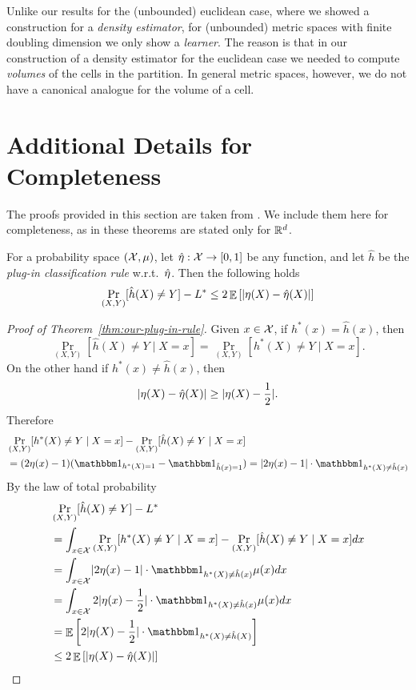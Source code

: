\documentclass[12pt,a4paper,oneside,onecolumn]{book}
\begin{document}
\begin{remark}
Unlike our results for the (unbounded) euclidean case, where we showed a construction for a {\em density estimator}, for (unbounded) metric spaces with finite doubling dimension we only show a {\em learner}. The reason is that in our construction of a density estimator for the euclidean case we needed to compute {\em volumes} of the cells in the partition. In general metric spaces, however, we do not have a canonical analogue for the volume of a cell.
\end{remark}


\section{Additional Details for Completeness}\label{sec:additional}

The proofs provided in this section are taken from \cite{devroye2013probabilistic}. We include them here for completeness, as in \cite{devroye2013probabilistic} these theorems are stated only for $\mathbb{R}^d$.

\begin{theorem}
\label{thm:our-plug-in-rule}
For a probability space $(\mathcal{X}, \mu)$, 
let $\hat{\eta}:\mathcal{X}\rightarrow[0,1]$ be any function,
and let $\hat{h}$ be the \emph{plug-in classification rule} w.r.t.\ $\hat{\eta}$. 
Then the following holds
\[
\Pr_{(X,Y)}[\hat{h}(X)\neq Y] - L^* \leq 
2 \mathop{\mathbb{E}}\left[\lvert\eta(X)-\hat{\eta}(X)\rvert\right]
\]
\end{theorem}

\begin{proof}[Proof of Theorem~\ref{thm:our-plug-in-rule}]
Given $x\in\mathcal{X}$,
if $h^*(x)=\hat{h}(x)$,
then
\[
\Pr_{(X,Y)}[\hat{h}(X)\neq Y \mid X=x]
=
\Pr_{(X,Y)}[h^*(X)\neq Y \mid X=x].
\]
On the other hand if
$h^*(x)\neq\hat{h}(x)$,
then
\[
\lvert\eta(X)-\hat{\eta}(X)\rvert 
\geq
\lvert\eta(X)-\frac{1}{2}\rvert.
\]
Therefore
\begin{align*}
    &\Pr_{(X,Y)}[h^*(X)\neq Y \mid X=x]
    -
    \Pr_{(X,Y)}[\hat{h}(X)\neq Y \mid X=x] \\
    &=(2\reg(x)-1)
    (\indicator{h^*(X)=1}-\indicator{\hat{h}(x)=1}) 
    =\abs{2\reg(x)-1}
    \cdot\indicator{h^*(X)\neq \hat{h}(x)} 
\end{align*}
By the law of total probability
\begin{align*}
    &\Pr_{(X,Y)}[\hat{h}(X)\neq Y] - L^* \\
    &=
    \int_{x\in\domain}
    \Pr_{(X,Y)}[h^*(X)\neq Y \mid X=x] 
    -
    \Pr_{(X,Y)}[\hat{h}(X)\neq Y \mid X=x]
    dx \\
    &=
    \int_{x\in\domain} \abs{2\reg(x)-1}
    \cdot\indicator{h^*(X)\neq \hat{h}(x)} \measure(x) dx \\
    &=\int_{x\in\domain} 2\abs{\reg(x)-\frac{1}{2}}
    \cdot\indicator{h^*(X)\neq \hat{h}(x)} \measure(x) dx \\ 
    &= 
    \E\left[2\abs{\reg(X)-\frac{1}{2}}\cdot\indicator{h^*(X)\neq\hat{h}(X)}\right] \\
    &\leq 
    2 \E\left[\abs{\reg(X)-\hat{\reg}(X)}\right]
\end{align*}
\end{proof}
\end{document}
